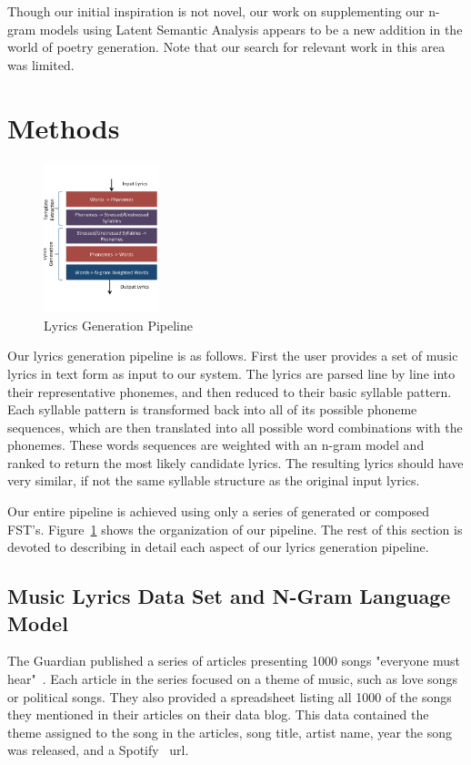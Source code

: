 \documentclass{vgtc}                          %
\begin{document}
Though our initial inspiration is not novel, our work on supplementing our n-gram
models using Latent Semantic Analysis appears to be a new addition
in the world of poetry generation. Note that our search for relevant work in this
area was limited.

\section{Methods}
\label{sec:methods}

\begin{figure}%
\centering
\includegraphics[width=0.3\textwidth]{images/pdf/pipeline.pdf}
\caption{Lyrics Generation Pipeline}
\label{fig:pipeline}
\end{figure}

Our lyrics generation pipeline is as follows. First the user provides
a set of music lyrics in text form as input to our system. The
lyrics are parsed line by line into their representative phonemes,
and then reduced to their basic syllable pattern.
Each syllable pattern is transformed back into all of its possible
phoneme sequences, which are then translated into all possible 
word combinations with the phonemes. These words sequences are weighted with
an n-gram model and ranked to return the most likely
candidate lyrics. The resulting lyrics should have very
similar, if not the same syllable structure as the original
input lyrics.

Our entire pipeline is achieved using only a series of
generated or composed FST's. Figure~\ref{fig:pipeline}
shows the organization of our pipeline.
The rest of this section is devoted to describing
in detail each aspect of our lyrics generation pipeline.

\subsection{Music Lyrics Data Set and N-Gram Language Model}
The Guardian published a series of articles presenting 1000 songs "everyone must hear"~\cite{guardian}.
Each article in the series focused on a theme of music, such as love songs or political songs.
They also provided a spreadsheet listing all 1000 of the songs they mentioned in their articles
on their data blog\cite{guardian2}. This
data contained the theme assigned to the song in the articles,
song title, artist name, year the song was released, and a Spotify~\cite{spotify} url.
\end{document}
